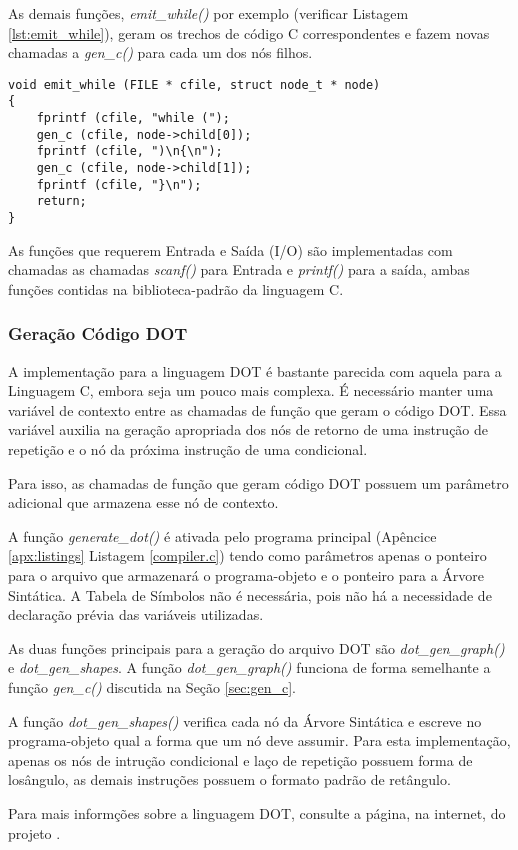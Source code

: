 As demais funções, \emph{emit\_while()} por exemplo (verificar Listagem
\ref{lst:emit_while}), geram os trechos de código C correspondentes e fazem novas
chamadas a \emph{gen\_c()} para cada um dos nós filhos.

\begin{lstlisting}[label=lst:emit_while,caption=Função geradora do comando
while em C]
void emit_while (FILE * cfile, struct node_t * node)
{
	fprintf (cfile, "while (");
	gen_c (cfile, node->child[0]);
	fprintf (cfile, ")\n{\n");
	gen_c (cfile, node->child[1]);
	fprintf (cfile, "}\n");
	return;
}
\end{lstlisting}

As funções que requerem Entrada e Saída (I/O) são implementadas com chamadas
as chamadas \emph{scanf()} para Entrada e \emph{printf()} para a saída, ambas
funções contidas na biblioteca-padrão da linguagem C.

\subsubsection{Geração Código DOT}
\label{sec:gen_dot}

A implementação para a linguagem DOT é bastante parecida com aquela para a
Linguagem C, embora seja um pouco mais complexa. É necessário manter uma
variável de contexto entre as chamadas de função que geram o código DOT.
Essa variável auxilia na geração apropriada dos nós de retorno de uma
instrução de repetição e o nó da próxima instrução de uma condicional.

Para isso, as chamadas de função que geram código DOT possuem um parâmetro
adicional que armazena esse nó de contexto.

A função \emph{generate\_dot()} é ativada pelo programa principal
(Apêncice \ref{apx:listings} Listagem \ref{compiler.c}) tendo como parâmetros
apenas o ponteiro para o arquivo que armazenará o programa-objeto e o ponteiro
para a Árvore Sintática. A Tabela de Símbolos não é necessária, pois não há a
necessidade de declaração prévia das variáveis utilizadas.

As duas funções principais para a geração do arquivo DOT são
\emph{dot\_gen\_graph()} e \emph{dot\_gen\_shapes}. A função
\emph{dot\_gen\_graph()} funciona de forma semelhante a função
\emph{gen\_c()} discutida na Seção \ref{sec:gen_c}.

A função \emph{dot\_gen\_shapes()} verifica cada nó da Árvore Sintática e
escreve no programa-objeto qual a forma que um nó deve assumir. Para esta
implementação, apenas os nós de intrução condicional e laço de repetição
possuem forma de losângulo, as demais instruções possuem o formato padrão de
retângulo.

Para mais informções sobre a linguagem DOT, consulte a página, na internet, do
projeto .

